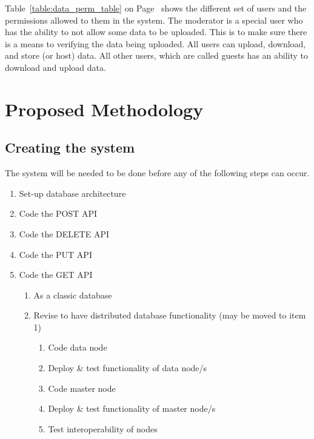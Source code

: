 \documentclass{article}
\begin{document}
Table~\ref{table:data_perm_table} on Page~\pageref{table:data_perm_table} shows the different set of users and the permissions allowed to them in the system. The moderator is a special user who has the ability to not allow some data to be uploaded. This is to make sure there is a means to verifying the data being uploaded. All users can upload, download, and store (or host) data. All other users, which are called guests has an ability to download and upload data.


\section{Proposed Methodology}


\subsection{Creating the system}
The system will be needed to be done before any of the following steps can occur. 
\begin{enumerate}
    \item Set-up database architecture
    \item Code the POST API
    \item Code the DELETE API
    \item Code the PUT API
    \item Code the GET API
    \begin{enumerate}
        \item As a classic database
        \item Revise to have distributed database functionality (may be moved to item 1) 
        \begin{enumerate}
            \item Code data node
            \item Deploy \& test functionality of data node/s
            \item Code master node
            \item Deploy \& test functionality of master node/s
            \item Test interoperability of nodes
        \end{enumerate}
    \end{enumerate}
\end{enumerate}
\end{document}
